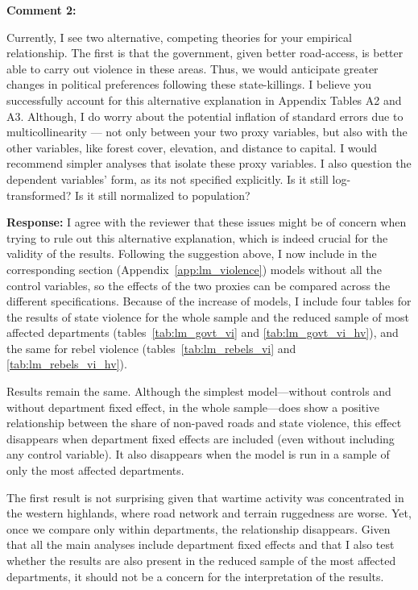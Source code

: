\documentclass[12pt, a4paper, notitlepage]{article}
\begin{document}
\vspace{15pt}
\noindent\textbf{Comment 2:}
\begin{displayquote}
Currently, I see two alternative, competing theories for your empirical relationship. The first is that the government, given better road-access, is better able to carry out violence in these areas. Thus, we would anticipate greater changes in political preferences following these state-killings. I believe you successfully account for this alternative explanation in Appendix Tables A2 and A3. Although, I do worry about the potential inflation of standard errors due to multicollinearity — not only between your two proxy variables, but also with the other variables, like forest cover, elevation, and distance to capital. I would recommend simpler analyses that isolate these proxy variables. I also question the dependent variables’ form, as its not specified explicitly. Is it still log- transformed? Is it still normalized to population?
\end{displayquote}

\noindent\textbf{Response:} I agree with the reviewer that these issues might be of concern when trying to rule out this alternative explanation, which is indeed crucial for the validity of the results. Following the suggestion above, I now include in the corresponding section (Appendix~\ref{app:lm_violence}) models without all the control variables, so the effects of the two proxies can be compared across the different specifications.
Because of the increase of models, I include four tables for the results of state violence for the whole sample and the reduced sample of most affected departments (tables~\ref{tab:lm_govt_vi} and \ref{tab:lm_govt_vi_hv}), and the same for rebel violence (tables~\ref{tab:lm_rebels_vi} and \ref{tab:lm_rebels_vi_hv}).

Results remain the same. Although the simplest model---without controls and without department fixed effect, in the whole sample---does show a positive relationship between the share of non-paved roads and state violence, this effect disappears when department fixed effects are included (even without including any control variable). It also disappears when the model is run in a sample of only the most affected departments.

The first result is not surprising given that wartime activity was concentrated in the western highlands, where road network and terrain ruggedness are worse. Yet, once we compare only within departments, the relationship disappears.
Given that all the main analyses include department fixed effects and that I also test whether the results are also present in the reduced sample of the most affected departments, it should not be a concern for the interpretation of the results.
\end{document}
